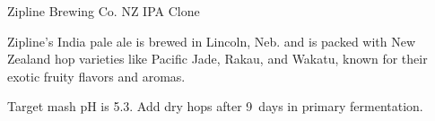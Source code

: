 \begin{recipie}{Zipline Brewing Co. NZ IPA Clone}

\begin{aboutblock}
Zipline's India pale ale is brewed in Lincoln, Neb. and is packed with New Zealand
hop varieties like Pacific Jade, Rakau, and Wakatu, known for their exotic fruity
flavors and aromas. \sourceaha
\end{aboutblock}


\begin{methodandtiming}
 
\begin{mashsteps}
\end{mashsteps}

\begin{directions}
Target mash pH is 5.3. Add dry hops after 9~days in primary fermentation.
\end{directions}

\end{methodandtiming}

\pagebreak

\begin{ingredientsblock}

\begin{malts}
\end{malts}

\begin{hops}
\end{hops}


\end{ingredientsblock}

\end{recipie}